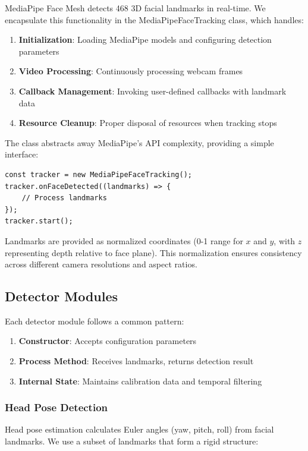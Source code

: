 \documentclass[sigconf]{acmart}
\begin{document}
MediaPipe Face Mesh detects 468 3D facial landmarks in real-time. We encapsulate this functionality in the MediaPipeFaceTracking class, which handles:

\begin{enumerate}
\item \textbf{Initialization}: Loading MediaPipe models and configuring detection parameters
\item \textbf{Video Processing}: Continuously processing webcam frames
\item \textbf{Callback Management}: Invoking user-defined callbacks with landmark data
\item \textbf{Resource Cleanup}: Proper disposal of resources when tracking stops
\end{enumerate}

The class abstracts away MediaPipe's API complexity, providing a simple interface:

\begin{lstlisting}
const tracker = new MediaPipeFaceTracking();
tracker.onFaceDetected((landmarks) => {
    // Process landmarks
});
tracker.start();
\end{lstlisting}

Landmarks are provided as normalized coordinates (0-1 range for $x$ and $y$, with $z$ representing depth relative to face plane). This normalization ensures consistency across different camera resolutions and aspect ratios.

\subsection{Detector Modules}

Each detector module follows a common pattern:

\begin{enumerate}
\item \textbf{Constructor}: Accepts configuration parameters
\item \textbf{Process Method}: Receives landmarks, returns detection result
\item \textbf{Internal State}: Maintains calibration data and temporal filtering
\end{enumerate}

\subsubsection{Head Pose Detection}

Head pose estimation calculates Euler angles (yaw, pitch, roll) from facial landmarks. We use a subset of landmarks that form a rigid structure:
\end{document}
